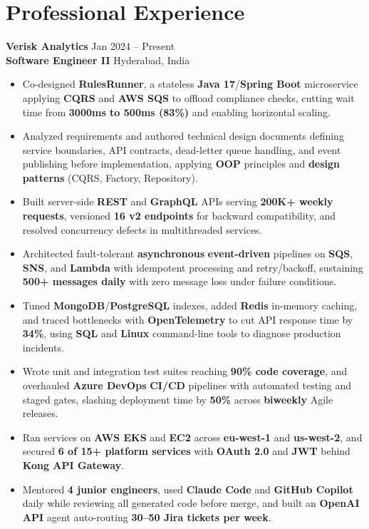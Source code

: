 \documentclass[a4paper,10pt]{article}
\begin{document}
\section*{Professional Experience}

\textbf{Verisk Analytics} \hfill Jan 2024 -- Present \\
\textbf{Software Engineer II} \hfill Hyderabad, India

\begin{itemize}[leftmargin=*]
    \item Co-designed \textbf{RulesRunner}, a stateless \textbf{Java 17}/\textbf{Spring Boot} microservice applying \textbf{CQRS} and \textbf{AWS SQS} to offload compliance checks, cutting wait time from \textbf{3000ms to 500ms (83\%)} and enabling horizontal scaling.
    \item Analyzed requirements and authored technical design documents defining service boundaries, API contracts, dead-letter queue handling, and event publishing before implementation, applying \textbf{OOP} principles and \textbf{design patterns} (CQRS, Factory, Repository).
    \item Built server-side \textbf{REST} and \textbf{GraphQL} APIs serving \textbf{200K+ weekly requests}, versioned \textbf{16 v2 endpoints} for backward compatibility, and resolved concurrency defects in multithreaded services.
    \item Architected fault-tolerant \textbf{asynchronous} \textbf{event-driven} pipelines on \textbf{SQS}, \textbf{SNS}, and \textbf{Lambda} with idempotent processing and retry/backoff, sustaining \textbf{500+ messages daily} with zero message loss under failure conditions.
    \item Tuned \textbf{MongoDB}/\textbf{PostgreSQL} indexes, added \textbf{Redis} in-memory caching, and traced bottlenecks with \textbf{OpenTelemetry} to cut API response time by \textbf{34\%}, using \textbf{SQL} and \textbf{Linux} command-line tools to diagnose production incidents.
    \item Wrote unit and integration test suites reaching \textbf{90\% code coverage}, and overhauled \textbf{Azure DevOps} \textbf{CI/CD} pipelines with automated testing and staged gates, slashing deployment time by \textbf{50\%} across \textbf{biweekly} Agile releases.
    \item Ran services on \textbf{AWS EKS} and \textbf{EC2} across \textbf{eu-west-1} and \textbf{us-west-2}, and secured \textbf{6 of 15+ platform services} with \textbf{OAuth 2.0} and \textbf{JWT} behind \textbf{Kong API Gateway}.
    \item Mentored \textbf{4 junior engineers}, used \textbf{Claude Code} and \textbf{GitHub Copilot} daily while reviewing all generated code before merge, and built an \textbf{OpenAI API} agent auto-routing \textbf{30--50 Jira tickets per week}.
\end{itemize}
\end{document}
